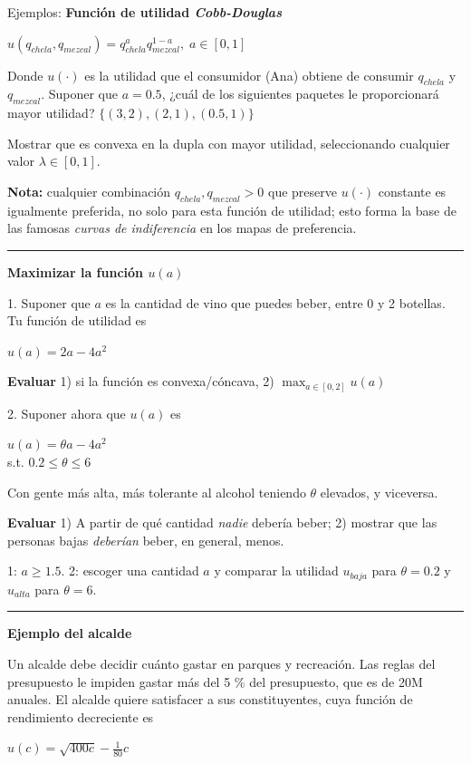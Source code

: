 \documentclass[12pt]{scrartcl}
\theoremstyle{definition}
\begin{document}
\begin{exbox}{Ejemplos:}
\textbf{Función de utilidad \textit{Cobb-Douglas}}
\begin{center}
    $u(q_{chela}, q_{mezcal})=q_{chela}^a q_{mezcal}^{1-a},\; a\in[0,1]$
\end{center}

Donde $u(\cdot)$ es la utilidad que el consumidor (Ana) obtiene de consumir $q_{chela}$ y $q_{mezcal}$. Suponer que $a=0.5$, ¿cuál de los siguientes paquetes le proporcionará mayor utilidad? $\{(3, 2), (2, 1), (0.5, 1)\}$

Mostrar que es convexa en la dupla con mayor utilidad, seleccionando cualquier valor $\lambda\in [0, 1]$.

\textbf{Nota:} cualquier combinación $q_{chela}, q_{mezcal}>0$ que preserve $u(\cdot)$ constante es igualmente preferida, no solo para esta función de utilidad; esto forma la base de las famosas \textit{curvas de indiferencia} en los mapas de preferencia.

\rule[1pt]{5cm}{1pt}

\textbf{Maximizar la función $u(a)$}

1. Suponer que $a$ es la cantidad de vino que puedes beber, entre 0 y 2 botellas. Tu función de utilidad es
\begin{center}
    $u(a)=2a-4a^2$
\end{center}

\textbf{Evaluar} 1) si la función es convexa/cóncava, 2) $\max_{a\in[0,2]} u(a)$

2. Suponer ahora que $u(a)$ es
\begin{center}
    $u(a)=\theta a-4a^2$\\
    s.t. $0.2\leq\theta \leq 6$
\end{center}

Con gente más alta, más tolerante al alcohol teniendo $\theta$ elevados, y viceversa. 

\textbf{Evaluar} 1) A partir de qué cantidad \textit{nadie} debería beber; 2) mostrar que las personas bajas \textit{deberían} beber, en general, menos. 

1: $a \geq 1.5$. 2: escoger una cantidad $a$ y comparar la utilidad $u_{baja}$ para $\theta = 0.2$ y $u_{alta}$ para $\theta = 6$.

\rule[1pt]{5cm}{1pt}

\textbf{Ejemplo del alcalde}

Un alcalde debe decidir cuánto gastar en parques y recreación. Las reglas del presupuesto le impiden gastar más del 5 \% del presupuesto, que es de 20M anuales. El alcalde quiere satisfacer a sus constituyentes, cuya función de rendimiento decreciente es 
\begin{center}
    $u(c)=\sqrt{400c}-\frac{1}{80}c$
\end{center}


\end{exbox}
\end{document}
